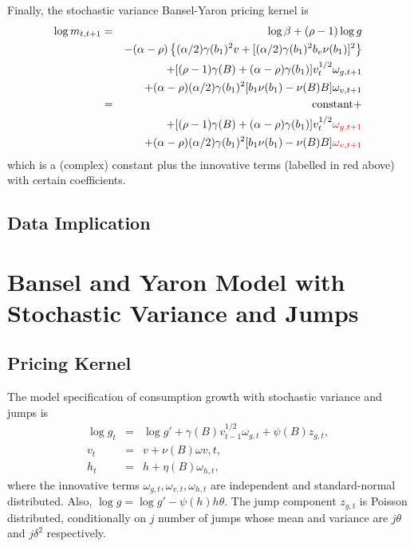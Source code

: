 \documentclass[11pt,reqno,final]{amsart}
\begin{document}
Finally, the stochastic variance Bansel-Yaron pricing kernel is
\begin{eqnarray*}
\log m_{t,t+1} &=& \log \beta + (\rho-1) \log g \\
    & & -(\alpha-\rho)\left\{(\alpha/2)\gamma(b_1)^2 v + [(\alpha/2)\gamma(b_1)^2 b_v\nu(b_1)]^2 \right\} \\
    & & + [(\rho-1)\gamma(B)+(\alpha-\rho)\gamma(b_1)] v_t^{1/2} \omega_{g,t+1} \\
    & & + (\alpha-\rho) (\alpha/2)\gamma(b_1)^2 [b_1\nu(b_1)-\nu(B)B]\omega_{v,t+1} \\
    &=& \textrm{constant} + \\
    & & + [(\rho-1)\gamma(B)+(\alpha-\rho)\gamma(b_1)] v_t^{1/2} {\color{red} \omega_{g,t+1}} \\
    & & + (\alpha-\rho) (\alpha/2)\gamma(b_1)^2 [b_1\nu(b_1)-\nu(B)B] {\color{red} \omega_{v,t+1}} \\
\end{eqnarray*}
which is a (complex) constant plus the innovative terms (labelled in red above) with certain coefficients.


\subsection{Data Implication}


\bigskip

\section{Bansel and Yaron Model with Stochastic Variance and Jumps}
\subsection{Pricing Kernel} \label{sec::by2_jump}
The model specification of consumption growth with stochastic variance and jumps is
\begin{eqnarray}
\log g_t &=& \log g' + \gamma(B) v_{t-1}^{1/2} \omega_{g,t} + \psi(B)z_{g,t}, \nonumber \\
v_t &=& v + \nu(B) \omega{v,t}, \\
h_t &=& h + \eta(B)\omega_{h,t}, \nonumber
\end{eqnarray}
where the innovative terms $\omega_{g,t}, \omega_{v,t}, \omega_{h,t}$ are independent and standard-normal distributed. Also, $\log g = \log g' -\psi(h)h\theta$. The jump component $z_{g,t}$ is Poisson distributed, conditionally on $j$ number of jumps whose mean and variance are $j\theta$ and $j\delta^2$ respectively.
\end{document}
